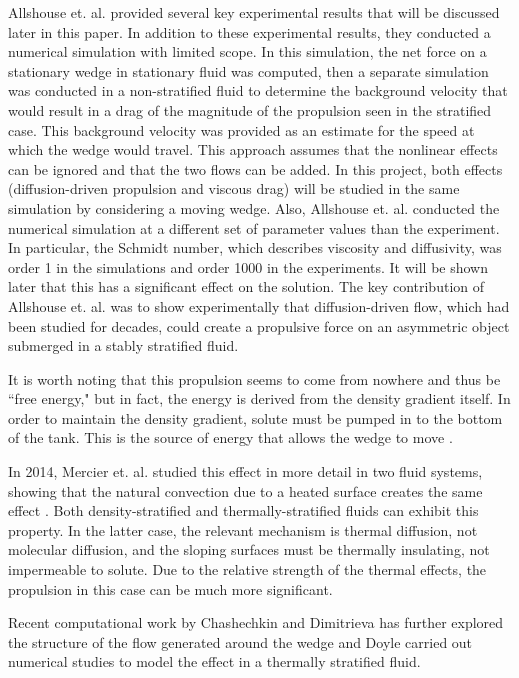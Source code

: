 \documentclass[12pt]{article}
\begin{document}
Allshouse et. al. provided several key experimental results \cite{allshouse2010propulsion} that will be discussed later in this paper. In addition to these experimental results, they conducted a numerical simulation with limited scope. In this simulation, the net force on a stationary wedge in stationary fluid was computed, then a separate simulation was conducted in a non-stratified fluid to determine the background velocity that would result in a drag of the magnitude of the propulsion seen in the stratified case. This background velocity was provided as an estimate for the speed at which the wedge would travel. This approach assumes that the nonlinear effects can be ignored and that the two flows can be added. In this project, both effects (diffusion-driven propulsion and viscous drag) will be studied in the same simulation by considering a moving wedge. Also, Allshouse et. al. conducted the numerical simulation at a different set of parameter values than the experiment. In particular, the Schmidt number, which describes viscosity and diffusivity, was order 1 in the simulations and order 1000 in the experiments. It will be shown later that this has a significant effect on the solution. The key contribution of Allshouse et. al. was to show experimentally that diffusion-driven flow, which had been studied for decades, could create a propulsive force on an asymmetric object submerged in a stably stratified fluid.

It is worth noting that this propulsion seems to come from nowhere and thus be ``free energy," but in fact, the energy is derived from the density gradient itself. In order to maintain the density gradient, solute must be pumped in to the bottom of the tank. This is the source of energy that allows the wedge to move \cite{allshouse2010propulsion} \cite{page_nature}.

In 2014, Mercier et. al. studied this effect in more detail in two fluid systems, showing that the natural convection due to a heated surface creates the same effect \cite{mercier2014self}. Both density-stratified and thermally-stratified fluids can exhibit this property. In the latter case, the relevant mechanism is thermal diffusion, not molecular diffusion, and the sloping surfaces must be thermally insulating, not impermeable to solute. Due to the relative strength of the thermal effects, the propulsion in this case can be much more significant.

Recent computational work by Chashechkin \cite{chashechkin} and Dimitrieva \cite{Dimitrieva2018} has further explored the structure of the flow generated around the wedge and Doyle \cite{doyle2011propulsion} carried out numerical studies to model the effect in a thermally stratified fluid. 
\end{document}
